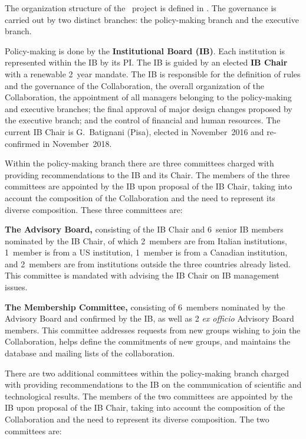 The organization structure of the \DS\ project is defined in . The governance is carried out by two distinct branches: the policy-making branch and the executive branch.

Policy-making is done by the {\bf Institutional Board (IB)}. Each institution is represented within the IB by its PI. The IB is guided by an elected {\bf IB Chair} with a renewable \num{2}~year mandate. The IB is responsible for the definition of rules and the governance of the Collaboration, the overall organization of the Collaboration, the appointment of all managers belonging to the policy-making and executive branches; the final approval of major design changes proposed by the executive branch; and the control of financial and human resources.  The current IB Chair is G.~Batignani (Pisa), elected in November~2016 and re-confirmed in November~2018.

Within the policy-making branch there are three committees charged with providing recommendations to the IB and its Chair.  The members of the three committees are appointed by the IB upon proposal of the IB Chair, taking into account the composition of the Collaboration and the need to represent its diverse composition.  These three committees are:

\begin{compactitem}
\item[\bf The Advisory Board,] consisting of the IB Chair and \num{6}~senior IB members nominated by the IB Chair, of which \num{2}~members are from Italian institutions, \num{1}~member is from a US institution, \num{1}~member is from a Canadian institution, and \num{2}~members are from institutions outside the three countries already listed.  This committee is mandated with advising the IB Chair on IB management issues.
\item[\bf The Membership Committee,] consisting of \num{6}~members nominated by the Advisory Board and confirmed by the IB, as well as \num{2} {\it ex officio} Advisory Board members.  This committee addresses requests from new groups wishing to join the Collaboration, helps define the commitments of new groups, and maintains the database and mailing lists of the collaboration.
\end{compactitem}
\smallskip
There are two additional committees within the policy-making branch charged with providing recommendations to the IB on the communication of scientific and technological results.  The members of the two committees are appointed by the IB upon proposal of the IB Chair, taking into account the composition of the Collaboration and the need to represent its diverse composition.  The two committees are:

